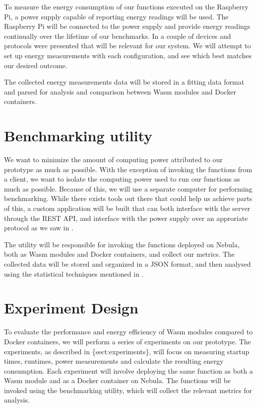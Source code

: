 \documentclass[
  table]{report}
\begin{document}
To measure the energy consumption of our functions executed on the
Raspberry Pi, a power supply capable of reporting energy readings will
be used. The Raspberry Pi will be connected to the power supply and
provide energy readings continually over the lifetime of our benchmarks.
In  a couple of devices and protocols were
presented that will be relevant for our system. We will attempt to set
up energy measurements with each configuration, and see which best
matches our desired outcome.

The collected energy measurements data will be stored in a fitting data
format and parsed for analysis and comparison between \ac{Wasm} modules
and Docker containers.

\section{Benchmarking utility}

We want to minimize the amount of computing power attributed to our
prototype as much as possible. With the exception of invoking the
functions from a client, we want to isolate the computing power used to
run our functions as much as possible. Because of this, we will use a
separate computer for performing benchmarking. While there exists tools
out there that could help us achieve parts of this, a custom application
will be built that can both interface with the server through the REST
API, and interface with the power supply over an approriate protocol as
we saw in .

The utility will be responsible for invoking the functions deployed on
Nebula, both as \ac{Wasm} modules and Docker containers, and collect our
metrics. The collected data will be stored and organized in a JSON
format, and then analysed using the statistical techniques mentioned in
.

\section{Experiment Design}

To evaluate the performance and energy efficiency of \ac{Wasm} modules
compared to Docker containers, we will perform a series of experiments
on our prototype. The experiments, as described in \{sect:experiments\},
will focus on measuring startup times, runtimes, power measurements and
calculate the resulting energy consumption. Each experiment will involve
deploying the same function as both a \ac{Wasm} module and as a Docker
container on Nebula. The functions will be invoked using the
benchmarking utility, which will collect the relevant metrics for
analysis.
\end{document}
